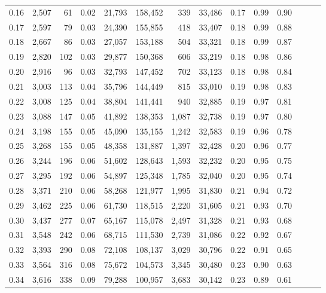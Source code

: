 \begin{tabular}{rrrrrrrrrrrrrr}
0.16 &  2,507 &   61 &  0.02 &   21,793 &  158,452 &     339 &  33,486 &  0.17 &  0.99 &      0.90 \\
0.17 &  2,597 &   79 &  0.03 &   24,390 &  155,855 &     418 &  33,407 &  0.18 &  0.99 &      0.88 \\
0.18 &  2,667 &   86 &  0.03 &   27,057 &  153,188 &     504 &  33,321 &  0.18 &  0.99 &      0.87 \\
0.19 &  2,820 &  102 &  0.03 &   29,877 &  150,368 &     606 &  33,219 &  0.18 &  0.98 &      0.86 \\
0.20 &  2,916 &   96 &  0.03 &   32,793 &  147,452 &     702 &  33,123 &  0.18 &  0.98 &      0.84 \\
0.21 &  3,003 &  113 &  0.04 &   35,796 &  144,449 &     815 &  33,010 &  0.19 &  0.98 &      0.83 \\
0.22 &  3,008 &  125 &  0.04 &   38,804 &  141,441 &     940 &  32,885 &  0.19 &  0.97 &      0.81 \\
0.23 &  3,088 &  147 &  0.05 &   41,892 &  138,353 &   1,087 &  32,738 &  0.19 &  0.97 &      0.80 \\
0.24 &  3,198 &  155 &  0.05 &   45,090 &  135,155 &   1,242 &  32,583 &  0.19 &  0.96 &      0.78 \\
0.25 &  3,268 &  155 &  0.05 &   48,358 &  131,887 &   1,397 &  32,428 &  0.20 &  0.96 &      0.77 \\
0.26 &  3,244 &  196 &  0.06 &   51,602 &  128,643 &   1,593 &  32,232 &  0.20 &  0.95 &      0.75 \\
0.27 &  3,295 &  192 &  0.06 &   54,897 &  125,348 &   1,785 &  32,040 &  0.20 &  0.95 &      0.74 \\
0.28 &  3,371 &  210 &  0.06 &   58,268 &  121,977 &   1,995 &  31,830 &  0.21 &  0.94 &      0.72 \\
0.29 &  3,462 &  225 &  0.06 &   61,730 &  118,515 &   2,220 &  31,605 &  0.21 &  0.93 &      0.70 \\
0.30 &  3,437 &  277 &  0.07 &   65,167 &  115,078 &   2,497 &  31,328 &  0.21 &  0.93 &      0.68 \\
0.31 &  3,548 &  242 &  0.06 &   68,715 &  111,530 &   2,739 &  31,086 &  0.22 &  0.92 &      0.67 \\
0.32 &  3,393 &  290 &  0.08 &   72,108 &  108,137 &   3,029 &  30,796 &  0.22 &  0.91 &      0.65 \\
0.33 &  3,564 &  316 &  0.08 &   75,672 &  104,573 &   3,345 &  30,480 &  0.23 &  0.90 &      0.63 \\
0.34 &  3,616 &  338 &  0.09 &   79,288 &  100,957 &   3,683 &  30,142 &  0.23 &  0.89 &      0.61 \\

\end{tabular}
